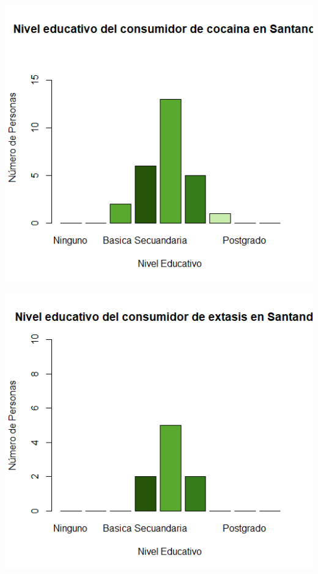 \documentclass[
]{article}
\begin{document}
\includegraphics{images/cocaina educacion santander.png}

\includegraphics{images/extasis educacion santander.png}
\end{document}
